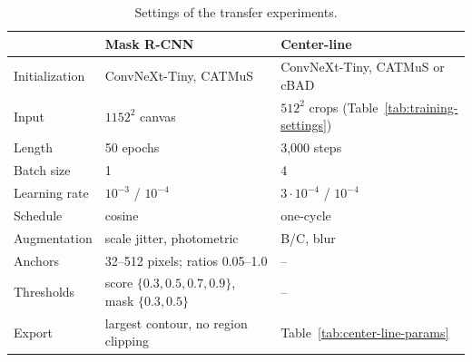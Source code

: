 \begin{table}[htbp]
    \centering
    \caption{Settings of the transfer experiments.}
    \label{tab:rq3-training-settings}
    \footnotesize
    \setlength{\tabcolsep}{4pt}
    \begin{tabular}{@{}lll@{}}
        \toprule
        & Mask R-CNN & Center-line \\
        \midrule
        Initialization & ConvNeXt-Tiny, CATMuS & ConvNeXt-Tiny, CATMuS or cBAD \\
        Input & \(1152^2\) canvas & \(512^2\) crops (Table~\ref{tab:training-settings}) \\
        Length & 50 epochs & 3,000 steps \\
        Batch size & 1 & 4 \\
        Learning rate & \(10^{-3}\) / \(10^{-4}\) & \(3\cdot10^{-4}\) / \(10^{-4}\) \\
        Schedule & cosine & one-cycle \\
        Augmentation & scale jitter, photometric & B/C, blur \\
        Anchors & 32--512 pixels; ratios 0.05--1.0 & -- \\
        Thresholds & score \(\{0.3,0.5,0.7,0.9\}\), mask \(\{0.3,0.5\}\) & -- \\
        Export & largest contour, no region clipping & Table~\ref{tab:center-line-params} \\
        \bottomrule
    \end{tabular}
    \par\smallskip
    \end{table}

